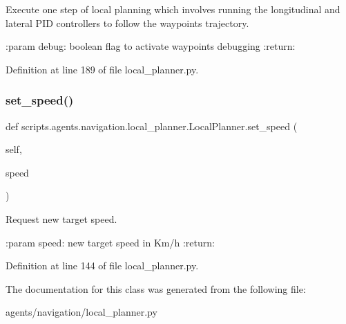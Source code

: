 \begin{DoxyVerb}Execute one step of local planning which involves running the longitudinal and lateral PID controllers to
follow the waypoints trajectory.

:param debug: boolean flag to activate waypoints debugging
:return:
\end{DoxyVerb}
 

Definition at line 189 of file local\+\_\+planner.\+py.

\mbox{\label{classscripts_1_1agents_1_1navigation_1_1local__planner_1_1LocalPlanner_a72967b7d87ed27590a5663d4904cc2d4}} 
\subsubsection{\texorpdfstring{set\+\_\+speed()}{set\_speed()}}
{\footnotesize\ttfamily def scripts.\+agents.\+navigation.\+local\+\_\+planner.\+Local\+Planner.\+set\+\_\+speed (\begin{DoxyParamCaption}\item[{}]{self,  }\item[{}]{speed }\end{DoxyParamCaption})}

\begin{DoxyVerb}Request new target speed.

:param speed: new target speed in Km/h
:return:
\end{DoxyVerb}
 

Definition at line 144 of file local\+\_\+planner.\+py.



The documentation for this class was generated from the following file\+:\begin{DoxyCompactItemize}
\item 
agents/navigation/local\+\_\+planner.\+py\end{DoxyCompactItemize}
